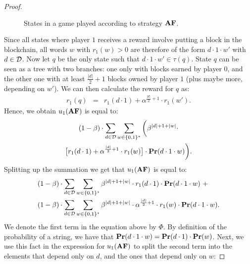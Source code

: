 \begin{proof}
\begin{figure}
\begin{center}
\end{center}

\caption{States in a game played according to strategy $\text{\rm {\bf AF}}$. \label{fig:proof-theorem-4}}
\end{figure}

Since all states where player $1$ receives a reward involve putting a block in the blockchain, all words 
$w$ with $r_1(w) > 0$ are therefore of the form $d\cdot 1\cdot w'$ with $d \in \mathcal{D}$. Now let $q$ be the only state such that  $d\cdot 1\cdot w' \in \tau(q)$.
State $q$ can be seen as a tree with two branches: one only with blocks earned by player $0$, and the other one 
with at least ${\frac{|d|}{2}+1}$ blocks owned by player $1$ (plus maybe more, depending on $w'$). 
We can then calculate the reward for $q$ as: 
\begin{eqnarray*}
r_1(q) & = & r_1(d \cdot 1) + \alpha^{\frac{|d|}{2}+1}\cdot r_1(w').
\end{eqnarray*}
Hence, we obtain $u_1(\text{\rm {\bf AF}})$ is equal to:
\begin{multline*}
 (1-\beta) \cdot \sum_{d\in \mathcal{D}}  \sum_{w\in \{0,1\}^*} \bigg(\beta^{|d|+1+|w|}\cdot \\
 \big[r_1(d\cdot 1) + \alpha^{\frac{|d|}{2}+1}\cdot r_1(w)\big] \cdot \mathbf{Pr}(d\cdot 1 \cdot w)\bigg).
\end{multline*}
%
Splitting up the summation we get that $ u_1(\text{\rm {\bf AF}})$ is equal to:
\begin{align*}
&(1-\beta) \cdot \sum_{d\in \mathcal{D}}  \sum_{w\in \{0,1\}^*}\beta^{|d|+1+|w|}\cdot r_1(d\cdot 1) \cdot \mathbf{Pr}(d\cdot 1\cdot w) \ +\\
 & (1-\beta) \cdot \sum_{d\in \mathcal{D}}  \sum_{w\in \{0,1\}^*}\beta^{|d|+1+|w|}\cdot  \alpha^{\frac{|d|}{2}+1}\cdot r_1(w) \cdot \mathbf{Pr}(d\cdot 1 \cdot w).
\end{align*}
%
We denote the first term in the equation above by $\Phi$. 
By definition of the probability of a string, we have that $\mathbf{Pr}(d\cdot 1\cdot w) = \mathbf{Pr}(d\cdot 1)\cdot \mathbf{Pr}(w)$. 
Next, we use this fact in the expression for $u_1(\text{\rm {\bf AF}})$ to split the second term into the elements that depend only on $d$, and the ones that depend only on $w$:

\end{proof}
